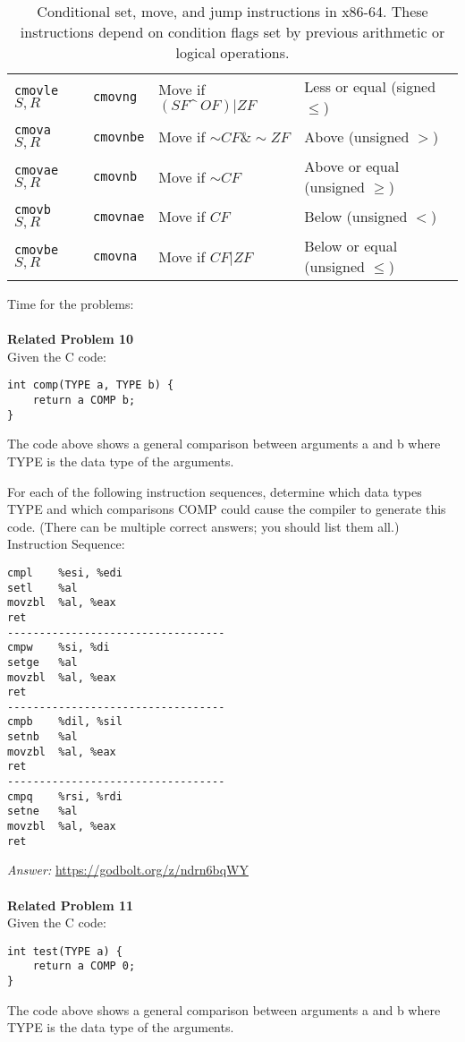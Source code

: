 \documentclass{article}
\begin{document}
\begin{table}[h]
\begin{tabular}{l l l l}
        \texttt{cmovle} $S, R$  & \texttt{cmovng} & Move if $(SF \^\ OF) | ZF$ & Less or equal (signed $\leq$) \\
        \texttt{cmova} $S, R$  & \texttt{cmovnbe} & Move if $\sim CF \& \sim ZF$ & Above (unsigned $>$) \\
        \texttt{cmovae} $S, R$  & \texttt{cmovnb} & Move if $\sim CF$ & Above or equal (unsigned $\geq$) \\
        \texttt{cmovb} $S, R$  & \texttt{cmovnae} & Move if $CF$ & Below (unsigned $<$) \\
        \texttt{cmovbe} $S, R$  & \texttt{cmovna} & Move if $CF | ZF$ & Below or equal (unsigned $\leq$) \\
        \bottomrule
    \end{tabular}
    \caption{Conditional set, move, and jump instructions in x86-64. These instructions depend on condition flags set by previous arithmetic or logical operations.}
    \label{set-and-jmp}
\end{table}

\clearpage
\noindent Time for the problems: \\
\\
\noindent\textbf{Related Problem 10}  \\
Given the C code:
\begin{verbatim}
int comp(TYPE a, TYPE b) {
    return a COMP b;
}
\end{verbatim}
The code above shows a general comparison between arguments a and b
where TYPE  is the data type of the arguments.

For each of the following instruction sequences, determine which data 
types TYPE and which comparisons COMP could cause the compiler to 
generate this code. (There can be multiple correct answers; you should 
list them all.)
\noindent Instruction Sequence:
\begin{verbatim}
cmpl    %esi, %edi
setl    %al
movzbl  %al, %eax
ret
----------------------------------
cmpw    %si, %di
setge   %al
movzbl  %al, %eax
ret
----------------------------------
cmpb    %dil, %sil
setnb   %al
movzbl  %al, %eax
ret
----------------------------------
cmpq    %rsi, %rdi
setne   %al
movzbl  %al, %eax
ret
\end{verbatim}

\noindent\textit{Answer: } \url{https://godbolt.org/z/ndrn6bqWY} \\
\\
\noindent\textbf{Related Problem 11}  \\
Given the C code:
\begin{verbatim}
int test(TYPE a) {
    return a COMP 0;
}
\end{verbatim}
The code above shows a general comparison between arguments a and b where TYPE is the data type of the arguments.
\end{document}
